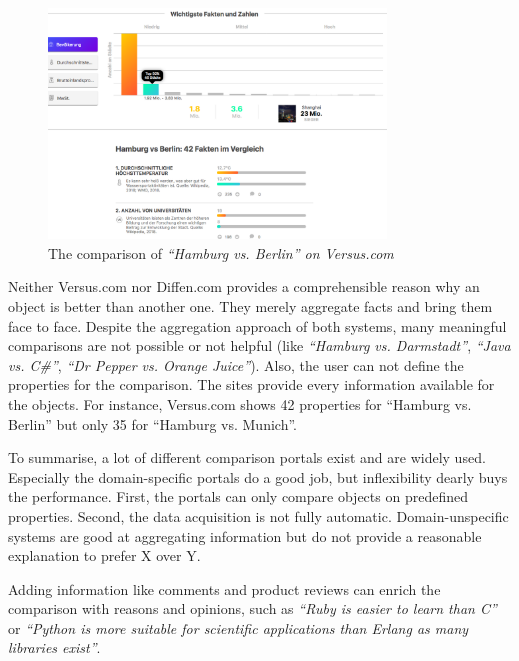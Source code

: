 \begin{figure}[htp]
    \centering
	\includegraphics[width=0.8\textwidth]{images/ds-sys/versus}
	\caption{The comparison of \emph{\enquote{Hamburg vs. Berlin} on Versus.com}}
		\label{img:versus}
\end{figure}

Neither Versus.com nor Diffen.com provides a comprehensible reason why an object is better than another one. They merely aggregate facts and bring them face to face. Despite the aggregation approach of both systems, many meaningful comparisons are not possible or not helpful (like \emph{\enquote{Hamburg vs. Darmstadt}}, \emph{\enquote{Java vs. C\#}}, \emph{\enquote{Dr Pepper vs. Orange Juice}}).
Also, the user can not define the properties for the comparison. The sites provide every information available for the objects. For instance, Versus.com shows 42 properties for \enquote{Hamburg vs. Berlin} but only 35 for \enquote{Hamburg vs. Munich}.
\newline

To summarise, a lot of different comparison portals exist and are widely used. Especially the domain-specific portals do a good job, but inflexibility dearly buys the performance. First, the portals can only compare objects on predefined properties. Second, the data acquisition is not fully automatic. Domain-unspecific systems are good at aggregating information but do not provide a reasonable explanation to prefer X over Y.

Adding information like comments and product reviews can enrich the comparison with reasons and opinions, such as \emph{\enquote{Ruby is easier to learn than C}} or \emph{\enquote{Python is more suitable for scientific applications than Erlang as many libraries exist}}.

\FloatBarrier

